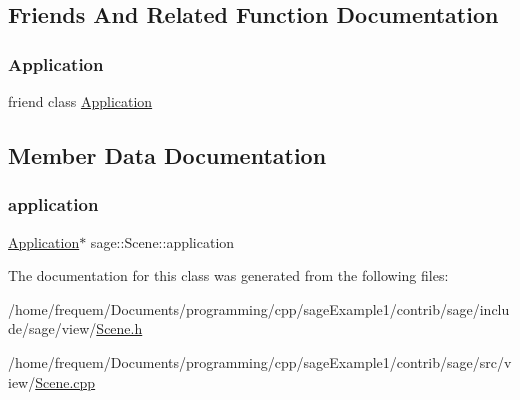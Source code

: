 \subsection{Friends And Related Function Documentation}
\mbox{\label{classsage_1_1Scene_a23f25bcc02a0e94c2f5a4188496b04d0}} 
\subsubsection{\texorpdfstring{Application}{Application}}
{\footnotesize\ttfamily friend class \mbox{\hyperlink{classsage_1_1Application}{Application}}\hspace{0.3cm}{\ttfamily [friend]}}



\subsection{Member Data Documentation}
\mbox{\label{classsage_1_1Scene_a06046ccc778f9e7257e777c048c481b9}} 
\subsubsection{\texorpdfstring{application}{application}}
{\footnotesize\ttfamily \mbox{\hyperlink{classsage_1_1Application}{Application}}$\ast$ sage\+::\+Scene\+::application\hspace{0.3cm}{\ttfamily [protected]}}



The documentation for this class was generated from the following files\+:\begin{DoxyCompactItemize}
\item 
/home/frequem/\+Documents/programming/cpp/sage\+Example1/contrib/sage/include/sage/view/\mbox{\hyperlink{Scene_8h}{Scene.\+h}}\item 
/home/frequem/\+Documents/programming/cpp/sage\+Example1/contrib/sage/src/view/\mbox{\hyperlink{Scene_8cpp}{Scene.\+cpp}}\end{DoxyCompactItemize}
